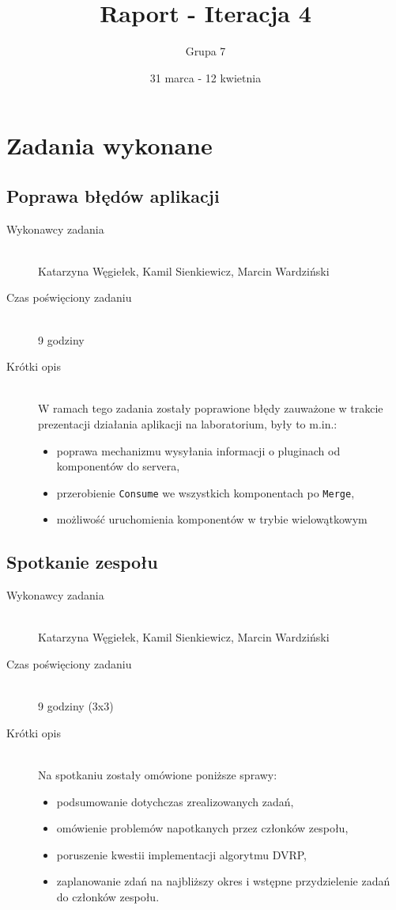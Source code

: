\documentclass[a4paper]{article}
\title{Raport - Iteracja 4}
\date{31 marca - 12 kwietnia}
\author{Grupa 7}
\begin{document}
\maketitle

\section{Zadania wykonane}
\subsection{Poprawa błędów aplikacji}
\begin{description}
    \item[Wykonawcy zadania] \hfill \\ Katarzyna Węgiełek, Kamil Sienkiewicz, Marcin Wardziński
    \item[Czas poświęciony zadaniu] \hfill \\ 9 godziny
    \item[Krótki opis] \hfill \\ W ramach tego zadania zostały poprawione błędy zauważone w trakcie prezentacji działania aplikacji na laboratorium, były to m.in.:
    \begin{itemize}
    	\item poprawa mechanizmu wysyłania informacji o pluginach od komponentów do servera,
    	\item przerobienie \texttt{Consume} we wszystkich komponentach po \texttt{Merge},
    	\item możliwość uruchomienia komponentów w trybie wielowątkowym
    \end{itemize}
\end{description}
\subsection{Spotkanie zespołu}
\begin{description}
    \item[Wykonawcy zadania] \hfill \\ Katarzyna Węgiełek, Kamil Sienkiewicz, Marcin Wardziński
    \item[Czas poświęciony zadaniu] \hfill \\ 9 godziny (3x3)
    \item[Krótki opis] \hfill \\ Na spotkaniu zostały omówione poniższe sprawy:
    \begin{itemize}
    	\item podsumowanie dotychczas zrealizowanych zadań,
    	\item omówienie problemów napotkanych przez członków zespołu,
    	\item poruszenie kwestii implementacji algorytmu DVRP,
    	\item zaplanowanie zdań na najbliższy okres i wstępne przydzielenie zadań do członków zespołu.
    \end{itemize}
\end{description}

   
\end{document}
